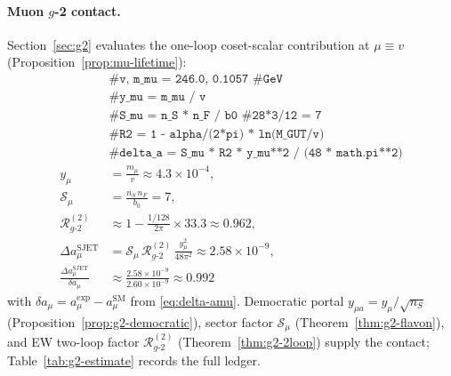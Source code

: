 \documentclass[aps,prd,onecolumn,amsmath,amssymb,nofootinbib,11pt]{revtex4-2}
\numberwithin{equation}{section}
\theoremstyle{plain}
\theoremstyle{definition}
\theoremstyle{remark}
\begin{document}
\paragraph{Muon $g$-2 contact.}
Section~\ref{sec:g2} evaluates the one-loop coset-scalar contribution at
$\mu\equiv v$ (Proposition~\ref{prop:mu-lifetime}):
\begin{equation}\label{eq:workbook-g2}
\begin{aligned}
  &\texttt{\# v, m\_mu = 246.0, 0.1057  \# GeV}\\
  &\texttt{\# y\_mu = m\_mu / v}\\
  &\texttt{\# S\_mu = n\_S * n\_F / b0  \# 28*3/12 = 7}\\
  &\texttt{\# R2 = 1 - alpha/(2*pi) * ln(M\_GUT/v)}\\
  &\texttt{\# delta\_a = S\_mu * R2 * y\_mu**2 / (48 * math.pi**2)}\\
  y_\mu &= \frac{m_\mu}{v}\approx 4.3\times 10^{-4},\\
  \mathcal{S}_\mu &= \frac{n_S\,n_F}{b_0}=7,\\
  \mathcal{R}_{g\text{-}2}^{(2)}
  &\approx 1-\frac{1/128}{2\pi}\times 33.3
  \approx 0.962,\\
  \Delta a_\mu^{\mathrm{SJET}}
  &= \mathcal{S}_\mu\,\mathcal{R}_{g\text{-}2}^{(2)}\,
  \frac{y_\mu^2}{48\pi^2}
  \approx 2.58\times 10^{-9},\\
  \frac{\Delta a_\mu^{\mathrm{SJET}}}{\delta a_\mu}
  &\approx \frac{2.58\times 10^{-9}}{2.60\times 10^{-9}}
  \approx 0.992
\end{aligned}
\end{equation}
with $\delta a_\mu=a_\mu^{\mathrm{exp}}-a_\mu^{\mathrm{SM}}$ from
\eqref{eq:delta-amu}. Democratic portal
$y_{\mu a}=y_\mu/\sqrt{n_S}$ (Proposition~\ref{prop:g2-democratic}),
sector factor $\mathcal{S}_\mu$ (Theorem~\ref{thm:g2-flavon}), and EW
two-loop factor $\mathcal{R}_{g\text{-}2}^{(2)}$ (Theorem~\ref{thm:g2-2loop})
supply the contact; Table~\ref{tab:g2-estimate} records the full ledger.
\end{document}
